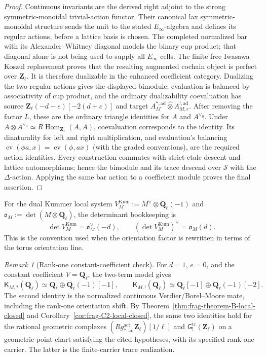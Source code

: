 \documentclass[11pt]{article}
\theoremstyle{definition}
\theoremstyle{remark}
\newtheorem{remark}[theorem]{Remark}
\begin{document}
\begin{proof}
Continuous invariants are the derived right adjoint to the strong
symmetric-monoidal trivial-action functor.  Their canonical lax
symmetric-monoidal structure sends the unit to the stated
$E_\infty$-algebra and defines its regular actions, before a lattice
basis is chosen.  The completed normalized bar with its
Alexander--Whitney diagonal models the binary cup product; that
diagonal alone is not being used to supply all $E_\infty$ cells.  The finite free Iwasawa--Koszul replacement proves
that the resulting augmented cochain object is perfect over
\(\mathbf Z_\ell\).  It is therefore dualizable in the enhanced coefficient
category.  Dualizing the two regular actions gives the displayed bimodule;
evaluation is balanced by associativity of cup product, and the ordinary
dualizability coevaluation has source
\(\mathbf Z_\ell(-d-e)[-2(d+e)]\) and target
\(A^{*,\mathrm{ad}}_M\widehat\otimes
A^{!,\mathrm{ad}}_{M,e}\).  After removing the factor $L$, these are the ordinary triangle
identities for $A$ and $A^{\vee_0}$.  Under
$A\otimes A^{\vee_0}\simeq R\operatorname{Hom}_{\mathbf Z_\ell}(A,A)$,
coevaluation corresponds to the identity.  Its dinaturality for
left and right multiplication, and evaluation's balancing
$\operatorname{ev}(\phi a,x)=\operatorname{ev}(\phi,ax)$
(with the graded conventions), are the required action identities.
Every construction commutes with
strict-etale descent and lattice automorphisms; hence the bimodule and its
trace descend over \(\mathscr S\) with the \(\Delta\)-action.  Applying the
same bar action to a coefficient module proves the final assertion.
\end{proof}

For the dual Kummer local system
\(V_M^{\mathrm{Kum}}:=M^\vee\otimes\mathbf Q_\ell(-1)\) and
\(\mathfrak o_M:=\det(M\otimes\mathbf Q_\ell)\), the determinant bookkeeping is
\[
 \det V_M^{\mathrm{Kum}}=\mathfrak o_M^\vee(-d),
 \qquad
 (\det V_M^{\mathrm{Kum}})^\vee=\mathfrak o_M(d).
\]
This is the convention used when the orientation factor is rewritten in
terms of the torus orientation line.

\begin{remark}[Rank-one constant-coefficient check]
For $d=1$, $e=0$, and the constant coefficient $V=\mathbf Q_\ell$, the
two-term model gives
\[
 \mathsf K_{M,*}(\mathbf Q_\ell)
 \simeq \mathbf Q_\ell\oplus\mathbf Q_\ell(-1)[-1],
 \qquad
 \mathsf K_{M,!}(\mathbf Q_\ell)
 \simeq \mathbf Q_\ell[-1]\oplus\mathbf Q_\ell(-1)[-2].
\]
The second identity is the normalized continuous Verdier/Borel--Moore mate,
including the rank-one orientation shift.
By Theorem~\ref{thm:frag-theorem-B-local-closed} and
Corollary~\ref{cor:frag-C2-local-closed}, the same two identities hold for the
rational geometric complexes
$(Rg_{*,\mathrm{ad}}^{\mathrm{act}}\mathbf Z_\ell)[1/\ell]$ and
$\mathsf G_!^{\mathrm{tr}}(\mathbf Z_\ell)$ on a geometric-point chart
satisfying the cited hypotheses, with its specified rank-one carrier.
The latter is the finite-carrier trace realization.
\end{remark}
\end{document}
